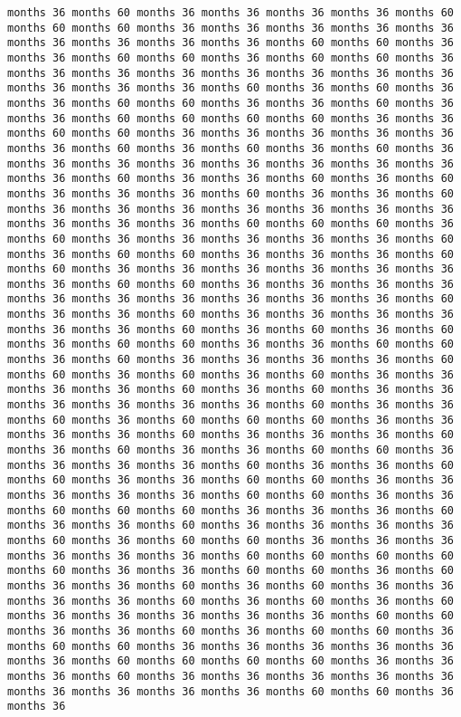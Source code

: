\documentclass[11pt]{article}
\begin{document}
\begin{Verbatim}[commandchars=\\\{\}, frame=single, framerule=2mm, rulecolor=\color{outerrorbackground}]
months 36 months 60 months 36 months 36 months 36 months 36 months 60 months 60 months 60 months 36 months 36 months 36 months 36 months 36 months 36 months 36 months 36 months 36 months 60 months 60 months 36 months 36 months 60 months 60 months 36 months 60 months 60 months 36 months 36 months 36 months 36 months 36 months 36 months 36 months 36 months 36 months 36 months 36 months 60 months 36 months 60 months 36 months 36 months 60 months 60 months 36 months 36 months 60 months 36 months 36 months 60 months 60 months 60 months 60 months 36 months 36 months 60 months 60 months 36 months 36 months 36 months 36 months 36 months 36 months 60 months 36 months 60 months 36 months 60 months 36 months 36 months 36 months 36 months 36 months 36 months 36 months 36 months 36 months 60 months 36 months 36 months 60 months 36 months 60 months 36 months 36 months 36 months 60 months 36 months 36 months 60 months 36 months 36 months 36 months 36 months 36 months 36 months 36 months 36 months 36 months 36 months 60 months 60 months 60 months 36 months 60 months 36 months 36 months 36 months 36 months 36 months 60 months 36 months 60 months 60 months 36 months 36 months 36 months 60 months 60 months 36 months 36 months 36 months 36 months 36 months 36 months 36 months 60 months 60 months 36 months 36 months 36 months 36 months 36 months 36 months 36 months 36 months 36 months 36 months 60 months 36 months 36 months 60 months 36 months 36 months 36 months 36 months 36 months 36 months 60 months 36 months 60 months 36 months 60 months 36 months 60 months 60 months 36 months 36 months 60 months 60 months 36 months 60 months 36 months 36 months 36 months 36 months 60 months 60 months 36 months 60 months 36 months 60 months 36 months 36 months 36 months 36 months 60 months 36 months 60 months 36 months 36 months 36 months 36 months 36 months 36 months 60 months 36 months 36 months 60 months 36 months 60 months 60 months 60 months 36 months 36 months 36 months 36 months 60 months 36 months 36 months 36 months 60 months 36 months 60 months 36 months 36 months 60 months 60 months 36 months 36 months 36 months 36 months 60 months 36 months 36 months 60 months 60 months 36 months 36 months 60 months 60 months 36 months 36 months 36 months 36 months 36 months 60 months 60 months 36 months 36 months 60 months 60 months 60 months 36 months 36 months 36 months 60 months 36 months 36 months 60 months 36 months 36 months 36 months 36 months 60 months 36 months 60 months 60 months 36 months 36 months 36 months 36 months 36 months 36 months 60 months 60 months 60 months 60 months 60 months 36 months 36 months 60 months 60 months 36 months 60 months 36 months 36 months 60 months 36 months 60 months 36 months 36 months 36 months 36 months 60 months 36 months 60 months 36 months 60 months 36 months 36 months 36 months 36 months 36 months 60 months 60 months 36 months 36 months 60 months 36 months 60 months 60 months 36 months 60 months 60 months 36 months 36 months 36 months 36 months 36 months 36 months 60 months 60 months 60 months 60 months 36 months 36 months 36 months 60 months 36 months 36 months 36 months 36 months 36 months 36 months 36 months 36 months 36 months 60 months 60 months 36 months 36 
\end{Verbatim}
\end{document}
